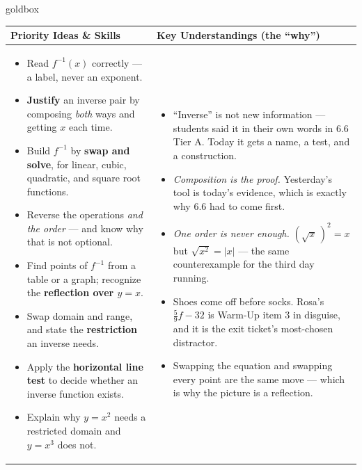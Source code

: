 \documentclass[10pt]{article}
\begin{document}
\renewcommand{\arraystretch}{1.4}
\begin{skillbox}{goldbox}
\begin{tabularx}{\linewidth}{@{}X|X@{}}
\textbf{Priority Ideas \& Skills} & \textbf{Key Understandings (the ``why'')} \\[2pt]
\hline
\vspace{-6pt}
\begin{itemize}[leftmargin=1.1em, nosep, after=\vspace{2pt}]
  \item Read $f^{-1}(x)$ correctly --- a label, never an exponent.
  \item \textbf{Justify} an inverse pair by composing \emph{both} ways and getting $x$ each time.
  \item Build $f^{-1}$ by \textbf{swap and solve}, for linear, cubic, quadratic, and square root functions.
  \item Reverse the operations \emph{and the order} --- and know why that is not optional.
  \item Find points of $f^{-1}$ from a table or a graph; recognize the \textbf{reflection over $y=x$}.
  \item Swap domain and range, and state the \textbf{restriction} an inverse needs.
  \item Apply the \textbf{horizontal line test} to decide whether an inverse function exists.
  \item Explain why $y=x^{2}$ needs a restricted domain and $y=x^{3}$ does not.
\end{itemize}
&
\vspace{-6pt}
\begin{itemize}[leftmargin=1.1em, nosep, after=\vspace{2pt}]
  \item ``Inverse'' is not new information --- students said it in their own words in 6.6 Tier A. Today it gets a name, a test, and a construction.
  \item \emph{Composition is the proof.} Yesterday's tool is today's evidence, which is exactly why 6.6 had to come first.
  \item \emph{One order is never enough.} $\left(\sqrt{x}\,\right)^{2}=x$ but $\sqrt{x^{2}}=|x|$ --- the same counterexample for the third day running.
  \item Shoes come off before socks. Rosa's $\frac59f-32$ is Warm-Up item 3 in disguise, and it is the exit ticket's most-chosen distractor.
  \item Swapping the equation and swapping every point are the same move --- which is why the picture is a reflection.

\end{itemize}
\end{tabularx}
\end{skillbox}
\end{document}
